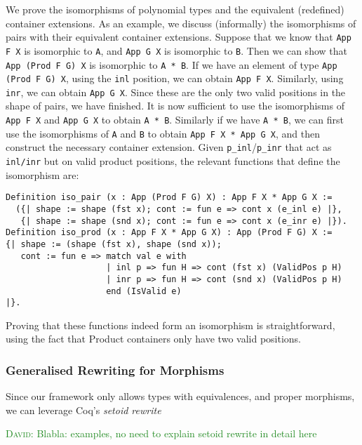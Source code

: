 \documentclass[a4paper, UKenglish, cleveref, autoref, thm-restate]{lipics-v2021}
\newcommand{\dcas}[1]{\textcolor{ForestGreen}{\textsc{David}: #1}}
\begin{document}
We prove the isomorphisms of polynomial types and the equivalent (redefined)
container extensions. As an example, we discuss (informally) the isomorphisms
of pairs with their equivalent container extensions. Suppose that we
know that \texttt{App F X} is isomorphic to \texttt{A}, and
\texttt{App G X} is isomorphic to \texttt{B}. Then we can
show that \texttt{App (Prod F G) X} is isomorphic to
\texttt{A * B}.  If we have an element of type 
\texttt{App (Prod F G) X},
using the \texttt{inl} position, we can obtain
\texttt{App F X}.  Similarly, using \texttt{inr}, we can
obtain \texttt{App G X}. Since these are the only two valid positions
in the shape of pairs, we have finished. It is now sufficient to use the
isomorphisms of \texttt{App F X} and \texttt{App G X} to
obtain \texttt{A * B}. Similarly if we have \texttt{A * B},
we can first use the isomorphisms of 
\texttt{A} and
\texttt{B} to obtain
\texttt{App F X * App G X}, and then construct the necessary container
extension. Given \texttt{p_inl}/\texttt{p_inr} that act as
\texttt{inl/inr} but on valid product positions, the relevant
functions that define the isomorphism are:
\begin{verbatim}
Definition iso_pair (x : App (Prod F G) X) : App F X * App G X :=
  ({| shape := shape (fst x); cont := fun e => cont x (e_inl e) |}, 
   {| shape := shape (snd x); cont := fun e => cont x (e_inr e) |}).
Definition iso_prod (x : App F X * App G X) : App (Prod F G) X :=
{| shape := (shape (fst x), shape (snd x));
   cont := fun e => match val e with 
                    | inl p => fun H => cont (fst x) (ValidPos p H)
                    | inr p => fun H => cont (snd x) (ValidPos p H)
                    end (IsValid e)
|}.
\end{verbatim}
Proving that these functions indeed form an isomorphism is straightforward,
using the fact that Product containers only have two valid positions.

\subsubsection{Generalised Rewriting for Morphisms}

Since our framework only allows types with equivalences, and proper morphisms,
we can leverage Coq's \emph{setoid rewrite}

\dcas{Blabla: examples, no need to explain setoid rewrite in detail here}
\end{document}
